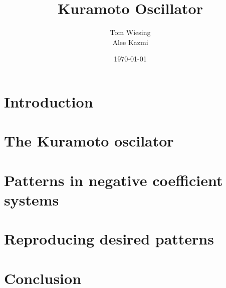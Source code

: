 \documentclass[12pt]{article}
\title{Kuramoto Oscillator}
\author{Tom Wiesing \\ Alee Kazmi}
\date{\today}
\begin{document}
	
	\maketitle
	\newpage
	
	\tableofcontents
	\newpage
	
	\section{Introduction}
	
	\newpage
	
	\section{The Kuramoto oscilator}
	
	\newpage
	
	\section{Patterns in negative coefficient systems}
	
	\newpage
	
	\section{Reproducing desired patterns}
	
	\newpage
	
	\section{Conclusion}
	
	
\end{document}
